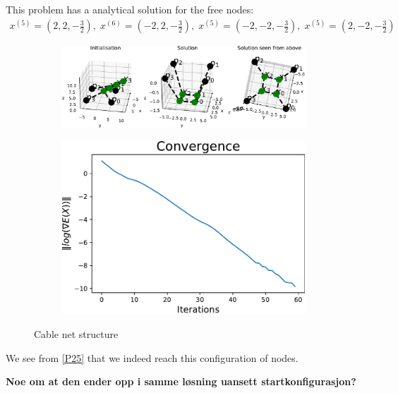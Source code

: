 This problem has a analytical solution for the free nodes:
\begin{equation*}
    \begin{gathered}
    x^{(5)} = (2,2,-\frac{3}{2}),\;x^{(6)} = (-2,2,-\frac{3}{2}),\;x^{(5)} = (-2,-2,-\frac{3}{2}),\;x^{(5)} = (2,-2,-\frac{3}{2})
    \end{gathered}
\end{equation*}


\begin{figure}
\centering
\begin{subfigure}{.72\textwidth}
  \centering
  \includegraphics[width=0.99\linewidth]{Bilder/p25.pdf}
\end{subfigure}%
\begin{subfigure}{.3\textwidth}
  \centering
  \includegraphics[width=0.99\linewidth]{Bilder/P25conv.pdf}
  \label{fig:sub2}
\end{subfigure}
\caption{Cable net structure}
\label{P25}
\end{figure}

We see from \eqref{P25} that we indeed reach this configuration of nodes. 

\textbf{Noe om at den ender opp i samme løsning uansett startkonfigurasjon?}


